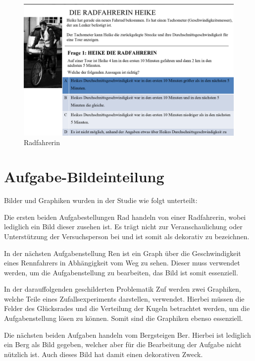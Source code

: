 \begin{figure}[H]
\noindent\hspace{0.5mm}\includegraphics[width=17cm]{./Ressourcen/Radfahrerin.png}
\caption{Radfahrerin}
\end{figure}

\section{Aufgabe-Bildeinteilung}

Bilder und Graphiken wurden in der Studie wie folgt unterteilt:

Die ersten beiden Aufgabestellungen \gls{Rad} handeln von einer Radfahrerin, wobei lediglich ein Bild dieser zusehen ist. Es trägt nicht zur Veranschaulichung oder Unterstützung der Versuchsperson bei und ist somit als dekorativ zu bezeichnen. 


In der nächsten Aufgabenstellung \gls{Ren} ist ein Graph über die Geschwindigkeit eines  Rennfahrers in Abhängigkeit vom Weg zu sehen. Dieser muss verwendet werden, um die Aufgabenstellung zu bearbeiten, das Bild ist somit essenziell. 


In der darauffolgenden geschilderten Problematik \gls{Zuf} werden zwei Graphiken, welche Teile eines Zufallsexperiments darstellen, verwendet. Hierbei müssen die Felder des Glücksrades und die Verteilung der Kugeln betrachtet werden, um die Aufgabenstellung lösen zu können. Somit sind die Graphiken ebenso essenziell.


Die nächsten beiden Aufgaben handeln vom Bergsteigen \gls{Ber}. Hierbei ist lediglich ein Berg als Bild gegeben, welcher aber für die Bearbeitung der Aufgabe nicht nützlich ist. Auch dieses Bild hat damit einen dekorativen Zweck.


